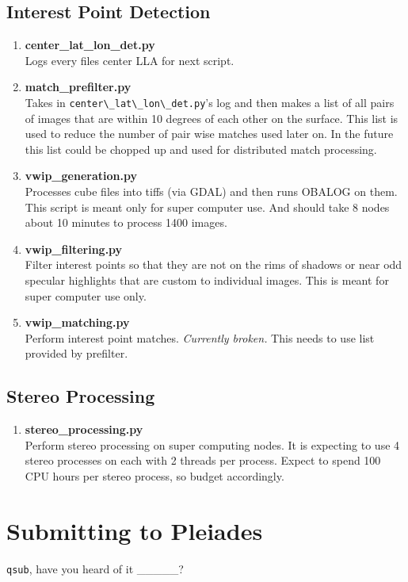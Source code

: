 \documentclass[12pt]{article}
\begin{document}
\subsection*{Interest Point Detection}

\begin{enumerate}

\item \textbf{center\_lat\_lon\_det.py} \hfill \\
  Logs every files center LLA for next script.

\item \textbf{match\_prefilter.py} \hfill \\
  Takes in \verb#center\_lat\_lon\_det.py#'s log and then makes a list of all pairs of images that are within 10 degrees of each other on the surface. This list is used to reduce the number of pair wise matches used later on. In the future this list could be chopped up and used for distributed match processing.

\item \textbf{vwip\_generation.py} \hfill \\
  Processes cube files into tiffs (via GDAL) and then runs OBALOG on them. This script is meant only for super computer use. And should take 8 nodes about 10 minutes to process 1400 images.

\item \textbf{vwip\_filtering.py} \hfill \\
  Filter interest points so that they are not on the rims of shadows or near odd specular highlights that are custom to individual images. This is meant for super computer use only.

\item \textbf{vwip\_matching.py} \hfill \\
  Perform interest point matches. \emph{Currently broken.} This needs to use list provided by prefilter.

\end{enumerate}

\subsection*{Stereo Processing}

\begin{enumerate}

\item \textbf{stereo\_processing.py} \hfill \\
  Perform stereo processing on super computing nodes. It is expecting to use 4 stereo processes on each with 2 threads per process. Expect to spend 100 CPU hours per stereo process, so budget accordingly.

\end{enumerate}

\section*{Submitting to Pleiades}

\verb#qsub#, have you heard of it \_\_\_\_\_?
\end{document}
